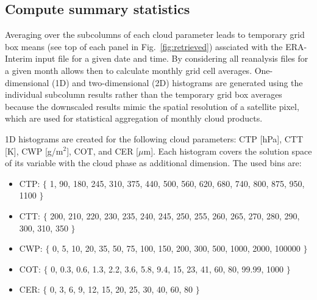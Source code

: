 \subsection{Compute summary statistics}


Averaging over the subcolumns of each cloud parameter leads to temporary grid box means 
(see top of each panel in Fig.~\ref{fig:retrieved}) 
assciated with the ERA-Interim input file for a given date and time.
By considering all reanalysis files for a given month allows then to calculate
monthly grid cell averages.
One-dimensional (1D) and two-dimensional (2D) histograms are generated using
the individual subcolumn results rather than the temporary grid box averages 
because the downscaled results mimic the spatial resolution of a satellite pixel, 
which are used for statistical aggregation of monthly cloud products.

1D histograms are created for the following cloud parameters: 
CTP [hPa], CTT [K], CWP [g/m$^{2}$], COT, and CER [$\mu$m]. 
Each histogram covers the solution space of its variable with the cloud phase as 
additional dimension. The used bins are:
\begin{itemize}\setlength\itemsep{0.2em}
 \item CTP: $\{$ 1, 90, 180, 245, 310, 375, 440, 500, 560, 620, 680, 740, 800, 875, 950, 1100 $\}$
 \item CTT: $\{$ 200, 210, 220, 230, 235, 240, 245, 250, 255, 260, 265, 270, 280, 290, 300, 310, 350 $\}$
 \item CWP: $\{$ 0, 5, 10, 20, 35, 50, 75, 100, 150, 200, 300, 500, 1000, 2000, 100000 $\}$ 
 \item COT: $\{$ 0, 0.3, 0.6, 1.3, 2.2, 3.6, 5.8, 9.4, 15, 23, 41, 60, 80, 99.99, 1000 $\}$
 \item CER: $\{$ 0, 3, 6, 9, 12, 15, 20, 25, 30, 40, 60, 80 $\}$ 
\end{itemize}
      

